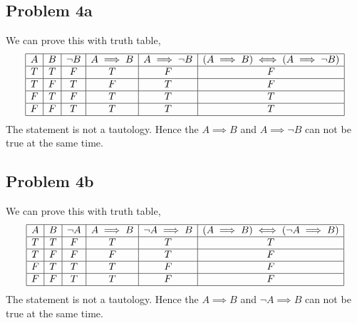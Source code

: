 \documentclass[answers]{exam}
\theoremstyle{mytheoremstyle}
\theoremstyle{mytheoremstyle}
\theoremstyle{myproblemstyle}
\begin{document}
\subsection*{Problem 4a}
\begin{framed}
    We can prove this with truth table,
    \begin{displaymath}
        \begin{array}{|c|c|c|c|c|c|}
            \hline
            A & B & \lnot B & A\implies B & A\implies\lnot B & (A\implies B) \iff(A\implies\lnot B) \\\hline
            T & T & F       & T           & F                & F                                    \\\hline
            T & F & T       & F           & T                & F                                    \\\hline
            F & T & F       & T           & T                & T                                    \\\hline
            F & F & T       & T           & T                & T                                    \\\hline
        \end{array}
    \end{displaymath}
    The statement is not a tautology. Hence the \(A\implies B\) and \(A\implies\lnot B\) can not be true at the same time.
\end{framed}

\subsection*{Problem 4b}
\begin{framed}
    We can prove this with truth table,
    \begin{displaymath}
        \begin{array}{|c|c|c|c|c|c|}
            \hline
            A & B & \lnot A & A\implies B & \lnot A\implies B & (A\implies B) \iff(\lnot A\implies B) \\\hline
            T & T & F       & T           & T                 & T                                     \\\hline
            T & F & F       & F           & T                 & F                                     \\\hline
            F & T & T       & T           & F                 & F                                     \\\hline
            F & F & T       & T           & F                 & F                                     \\\hline
        \end{array}
    \end{displaymath}
    The statement is not a tautology. Hence the \(A\implies B\) and \(\lnot A\implies B\) can not be true at the same time.
\end{framed}
\end{document}
